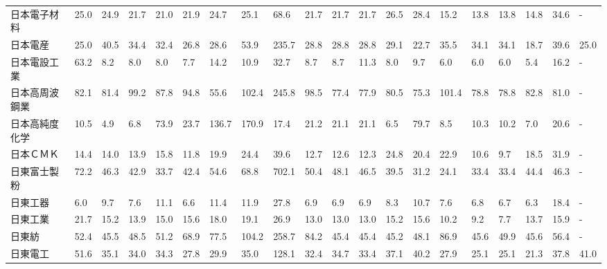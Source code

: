 \begin{longtable}[c]{lp{3mm}p{3mm}p{3mm}p{3mm}p{3mm}p{3mm}p{3mm}p{3mm}p{3mm}p{3mm}p{3mm}p{3mm}p{3mm}p{3mm}p{3mm}p{3mm}p{3mm}p{3mm}p{3mm}}
日本電子材料          &   25.0 &   24.9 &      21.7 &      21.0 &       21.9 &    24.7 &    25.1 &     68.6 &    21.7 &    21.7 &   21.7 &   26.5 &    28.4 &    15.2 &    13.8 &   13.8 &   14.8 &    34.6 &      - \\
日本電産            &   25.0 &   40.5 &      34.4 &      32.4 &       26.8 &    28.6 &    53.9 &    235.7 &    28.8 &    28.8 &   28.8 &   29.1 &    22.7 &    35.5 &    34.1 &   34.1 &   18.7 &    39.6 &   25.0 \\
日本電設工業          &   63.2 &    8.2 &       8.0 &       8.0 &        7.7 &    14.2 &    10.9 &     32.7 &     8.7 &     8.7 &   11.3 &    8.0 &     9.7 &     6.0 &     6.0 &    6.0 &    5.4 &    16.2 &      - \\
日本高周波鋼業         &   82.1 &   81.4 &      99.2 &      87.8 &       94.8 &    55.6 &   102.4 &    245.8 &    98.5 &    77.4 &   77.9 &   80.5 &    75.3 &   101.4 &    78.8 &   78.8 &   82.8 &    81.0 &      - \\
日本高純度化学         &   10.5 &    4.9 &       6.8 &      73.9 &       23.7 &   136.7 &   170.9 &     17.4 &    21.2 &    21.1 &   21.1 &    6.5 &    79.7 &     8.5 &    10.3 &   10.2 &    7.0 &    20.6 &      - \\
日本ＣＭＫ           &   14.4 &   14.0 &      13.9 &      15.8 &       11.8 &    19.9 &    24.4 &     39.6 &    12.7 &    12.6 &   12.3 &   24.8 &    20.4 &    22.9 &    10.6 &    9.7 &   18.5 &    31.9 &      - \\
日東富士製粉          &   72.2 &   46.3 &      42.9 &      33.7 &       42.4 &    54.6 &    68.8 &    702.1 &    50.4 &    48.1 &   46.5 &   39.5 &    31.2 &    24.1 &    33.4 &   33.4 &   44.4 &    46.3 &      - \\
日東工器            &    6.0 &    9.7 &       7.6 &      11.1 &        6.6 &    11.4 &    11.9 &     27.8 &     6.9 &     6.9 &    6.9 &    8.3 &    10.7 &     7.6 &     6.8 &    6.7 &    6.3 &    18.4 &      - \\
日東工業            &   21.7 &   15.2 &      13.9 &      15.0 &       15.6 &    18.0 &    19.1 &     26.9 &    13.0 &    13.0 &   13.0 &   15.2 &    15.6 &    10.2 &     9.2 &    7.7 &   13.7 &    15.9 &      - \\
日東紡             &   52.4 &   45.5 &      48.5 &      51.2 &       68.9 &    77.5 &   104.2 &    258.7 &    84.2 &    45.4 &   45.4 &   45.2 &    48.1 &    86.9 &    45.6 &   49.9 &   45.6 &    56.4 &      - \\
日東電工            &   51.6 &   35.1 &      34.0 &      34.3 &       27.8 &    29.9 &    35.0 &    128.1 &    32.4 &    34.7 &   33.4 &   37.1 &    40.2 &    27.9 &    25.1 &   25.1 &   21.3 &    37.8 &   41.0 \\

\end{longtable}
